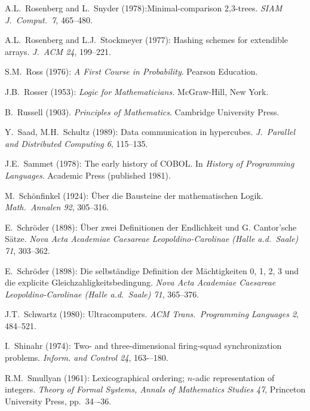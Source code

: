 \begin{thebibliography}{999}
A.L.~Rosenberg and L.~Snyder (1978):Minimal-comparison 2,3-trees.
{\it SIAM J.~Comput.~7}, 465--480.

A.L.~Rosenberg and L.J.~Stockmeyer (1977): Hashing schemes for
extendible arrays.  {\it J.~ACM 24}, 199--221.

S.M.~Ross (1976):
{\it A First Course in Probability}.
Pearson Education.

J.B.~Rosser (1953):
{\it Logic for Mathematicians.}
McGraw-Hill, New York.

B.~Russell (1903).  {\it Principles of Mathematics}.
Cambridge University Press. 



Y.~Saad, M.H.~Schultz (1989):
Data communication in hypercubes.
{\it J.~Parallel and Distributed Computing 6}, 115--135.


J.E.~Sammet (1978):
The early history of COBOL.  In {\it History of Programming
  Languages}.  Academic Press (published 1981).

M.~Sch\"onfinkel (1924): \"{U}ber die Bausteine der mathematischen
Logik.  {\it Math.~Annalen 92}, 305--316.

E.~Schr\"{o}der (1898): \"{U}ber zwei Definitionen der Endlichkeit und
G. Cantor'sche S\"{a}tze.  {\it Nova Acta Academiae Caesareae
Leopoldino-Carolinae (Halle a.d.~Saale) 71}, 303--362.

E.~Schr\"{o}der (1898): Die selbst\"{a}ndige Definition der
M\"{a}chtigkeiten 0, 1, 2, 3 und die explicite
Gleichzahligkeitsbedingung.  {\it Nova Acta Academiae Caesareae
Leopoldino-Carolinae (Halle a.d.~Saale) 71}, 365--376.

J.T.~Schwartz (1980):
Ultracomputers.
{\it ACM Trans.~Programming Languages 2}, 484--521.

I.~Shinahr (1974): Two- and three-dimensional firing-squad
synchronization problems.  {\it Inform. and Control 24}, 163-–180.

R.M.~Smullyan (1961):  Lexicographical ordering; $n$-adic
representation of integers.  
{\it Theory of Formal Systems, Annals of Mathematics Studies 47},
Princeton University Press, pp.~34–-36.


\end{thebibliography}
